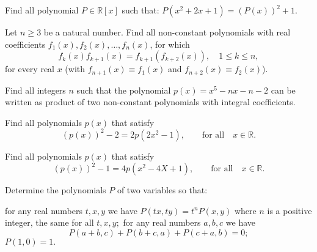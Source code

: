 \begin{question}
Find all polynomial $ P\in \mathbb {R}[x]$ such that: $P(x^2+2x+1)=(P(x))^2+1$.
\end{question}





\begin{question}
Let $ n\ge 3$ be a natural number. Find all non-constant polynomials with real coefficients $ f_{1}\left(x\right),f_{2}\left(x\right),\dots,f_{n}\left(x\right)$, for which
\[ f_{k}\left(x\right)f_{k+ 1}\left(x\right) = f_{k +1}\left(f_{k + 2}\left(x\right)\right), \quad  1\le k\le n,\]
for every real $ x$ (with $ f_{n +1}\left(x\right)\equiv f_{1}\left(x\right)$ and $ f_{n + 2}\left(x\right)\equiv f_{2}\left(x\right)$).
\end{question}





\begin{question}
Find all integers $n$ such that the polynomial $p(x)=x^5-nx-n-2$ can be written as product  of two non-constant polynomials with integral coefficients.
\end{question}




\begin{question}
Find all polynomials $p(x)$ that satisfy 
\[(p(x))^2-2=2p(2x^2-1), \qquad \text{for all} \quad x \in \mathbb R.\]
\end{question}




\begin{question}
Find all polynomials $p(x)$ that satisfy
\[(p(x))^2-1=4p(x^2-4X+1), \qquad \text{for all} \quad  x \in \mathbb R.\]
\end{question}







\begin{question}
Determine the polynomials $P$ of two variables so that:
\begin{tasks}
    \task for any real numbers $t,x,y$ we have $P(tx,ty) = t^n P(x,y)$ where $n$ is a positive integer, the same for all $t,x,y;$
    \task for any real numbers $a,b,c$ we have \[P(a + b,c) + P(b + c,a) + P(c + a,b) = 0;\]
    \task $P(1,0) =1.$
\end{tasks}
\end{question}



